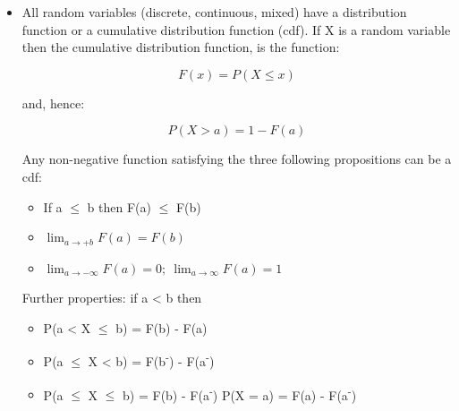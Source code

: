\documentclass[12pt]{report}
\renewcommand{\_}{\kern-1.5pt\textunderscore\kern-1.5pt}
\begin{document}
\begin{itemize}
	\item All random variables (discrete, continuous, mixed) have a distribution function or a cumulative distribution function (cdf). If X is a random variable then the cumulative distribution function, is the function:\par

 \[ F \left( x \right) =P \left( X \leq x \right)  \] \par

and, hence: \par

 \[ P \left( X>a \right) =1-F \left( a \right)  \] \par

Any non-negative function satisfying the three following propositions can be a cdf:\par

\begin{itemize}
	\item If a $ \leq $  b then F(a) $ \leq $  F(b)\par

	\item  \( \mathop{\lim }_{a \rightarrow +b}F \left( a \right) =F \left( b \right)  \) \par

	\item  \( \mathop{\lim }_{a \rightarrow -\infty}F \left( a \right) =0;~ \mathop{\lim }_{a \rightarrow \infty}F \left( a \right) =1 \) 
\end{itemize}\par

\begin{adjustwidth}{0.5in}{0.0in}
Further properties: if a < b then\par

\end{adjustwidth}

\begin{itemize}
	\item P(a < X $ \leq $  b) = F(b) - F(a)\par

	\item P(a $ \leq $  X < b) = F(b\textsuperscript{-}) - F(a\textsuperscript{-})\par

	\item P(a $ \leq $  X $ \leq $  b) = F(b) - F(a\textsuperscript{-})  P(X = a) = F(a) - F(a\textsuperscript{-})\par


\end{itemize}
\end{itemize}
\end{document}
